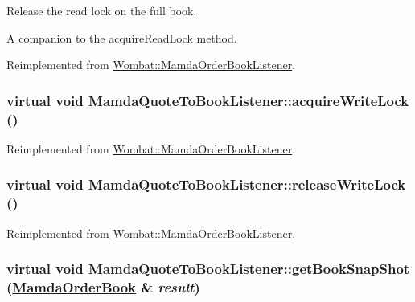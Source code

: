 Release the read lock on the full book. 

A companion to the acquire\-Read\-Lock method. 

Reimplemented from \hyperlink{classWombat_1_1MamdaOrderBookListener_c227fabc3c91c6dbef8a6e338a023858}{Wombat::Mamda\-Order\-Book\-Listener}.\hypertarget{classMamdaQuoteToBookListener_e29f743ba0e51a46e8eccf33ac196bfc}{
\subsubsection[acquireWriteLock]{\setlength{\rightskip}{0pt plus 5cm}virtual void Mamda\-Quote\-To\-Book\-Listener::acquire\-Write\-Lock ()}}
\label{classMamdaQuoteToBookListener_e29f743ba0e51a46e8eccf33ac196bfc}




Reimplemented from \hyperlink{classWombat_1_1MamdaOrderBookListener_601244fd9fd694d64dc54a568e8f5b06}{Wombat::Mamda\-Order\-Book\-Listener}.\hypertarget{classMamdaQuoteToBookListener_6c24b1f262c4d571b586fd0c9f5675ee}{
\subsubsection[releaseWriteLock]{\setlength{\rightskip}{0pt plus 5cm}virtual void Mamda\-Quote\-To\-Book\-Listener::release\-Write\-Lock ()}}
\label{classMamdaQuoteToBookListener_6c24b1f262c4d571b586fd0c9f5675ee}




Reimplemented from \hyperlink{classWombat_1_1MamdaOrderBookListener_184fb4af88e62c4d77fb54f52ac3bcb8}{Wombat::Mamda\-Order\-Book\-Listener}.\hypertarget{classMamdaQuoteToBookListener_161cca9523847d042a82af4924c91da6}{
\subsubsection[getBookSnapShot]{\setlength{\rightskip}{0pt plus 5cm}virtual void Mamda\-Quote\-To\-Book\-Listener::get\-Book\-Snap\-Shot (\hyperlink{classWombat_1_1MamdaOrderBook}{Mamda\-Order\-Book} \& {\em result})}}
\label{classMamdaQuoteToBookListener_161cca9523847d042a82af4924c91da6}


